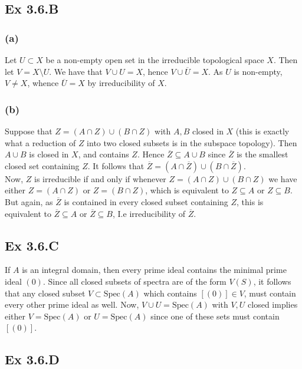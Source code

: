 \documentclass{article}
\theoremstyle{definition}
\newcommand{\Spec}{\text{Spec}}
\begin{document}
\subsection*{Ex 3.6.B}

\subsubsection*{(a)}

Let $U \subset X$ be a non-empty open set in the irreducible topological space
$X$. Then let $V = X \setminus U$. We have that $V \cup U = X$, hence $V \cup
	\overline{U} = X$. As $U$ is non-empty, $V \not = X$, whence $\overline{U} = X$
by irreducibility of $X$.

\subsubsection*{(b)}

Suppose that $Z = (A \cap Z) \cup (B \cap Z)$ with $A, B$ closed in $X$ (this
is exactly what a reduction of $Z$ into two closed subsets is in the subspace
topology). Then $A \cup B$ is closed in $X$, and contains $Z$. Hence
$\overline{Z} \subseteq A \cup B$ since $\overline{Z}$ is the smallest closed
set containing $Z$. It follows that $\overline{Z} = (A \cap \overline{Z}) \cup
	(B \cap \overline{Z})$. \\

Now, $Z$ is irreducible if and only if whenever $Z = (A \cap Z) \cup (B \cap Z)$
we have either $Z = (A \cap Z)$ or $Z = (B \cap Z)$, which is equivalent to
$Z \subseteq A$ or $Z \subseteq B$. But again, as $\overline{Z}$ is contained
in every closed subset containing $Z$, this is equivalent to $\overline{Z} \subseteq A$
or $\overline{Z} \subseteq B$, I.e irreducibility of $\overline{Z}$.

\subsection*{Ex 3.6.C}

If $A$ is an integral domain, then every prime ideal contains the minimal prime
ideal $(0)$. Since all closed subsets of spectra are of the form $V(S)$, it
follows that any closed subset $V \subset \Spec(A)$ which contains $[(0)] \in
	V$, must contain every other prime ideal as well. Now, $V \cup U = \Spec(A)$
with $V, U$ closed implies either $V = \Spec(A)$ or $U = \Spec(A)$ since one of
these sets must contain $[(0)]$.

\subsection*{Ex 3.6.D}
\end{document}
